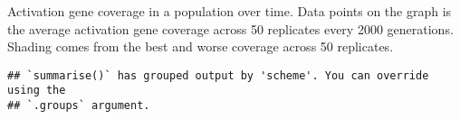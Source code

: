 \documentclass[]{book}
\newenvironment{Shaded}{\begin{snugshade}}{\end{snugshade}}
\newcommand{\DataTypeTok}[1]{\textcolor[rgb]{0.13,0.29,0.53}{#1}}
\newcommand{\KeywordTok}[1]{\textcolor[rgb]{0.13,0.29,0.53}{\textbf{#1}}}
\newcommand{\NormalTok}[1]{#1}
\newcommand{\OperatorTok}[1]{\textcolor[rgb]{0.81,0.36,0.00}{\textbf{#1}}}
\newcommand{\StringTok}[1]{\textcolor[rgb]{0.31,0.60,0.02}{#1}}
\begin{document}
Activation gene coverage in a population over time.
Data points on the graph is the average activation gene coverage across 50 replicates every 2000 generations.
Shading comes from the best and worse coverage across 50 replicates.

\begin{Shaded}
\end{Shaded}

\begin{verbatim}
## `summarise()` has grouped output by 'scheme'. You can override using the
## `.groups` argument.
\end{verbatim}
\end{document}
